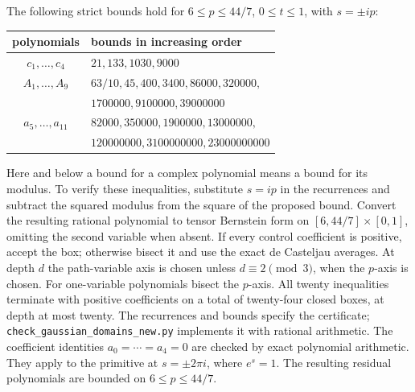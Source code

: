 \documentclass[11pt,reqno]{amsart}
\numberwithin{equation}{section}
\theoremstyle{definition}
\theoremstyle{remark}
\DeclareRobustCommand{\cert}[1]{\nolinkurl{#1}}
\begin{document}
The following strict bounds hold for
$6\le p\le44/7$, $0\le t\le1$, with $s=\pm ip$:
\begin{center}\small
\begin{tabular}{cl}
\toprule
polynomials & bounds in increasing order\\\midrule
$c_1,\ldots,c_4$ & $21,133,1030,9000$\\
$A_1,\ldots,A_9$ & $63/10,45,400,3400,86000,320000,$\\
 & $1700000,9100000,39000000$\\
$a_5,\ldots,a_{11}$ & $82000,350000,1900000,13000000,$\\
 & $120000000,3100000000,23000000000$\\\bottomrule
\end{tabular}
\end{center}
Here and below a bound for a complex polynomial means a bound for its
modulus. To verify these inequalities, substitute $s=ip$ in the
recurrences and subtract
the squared modulus from the square of the proposed bound. Convert
the resulting rational polynomial to tensor Bernstein form on
$[6,44/7]\times[0,1]$, omitting the second variable when absent.
If every control coefficient is positive, accept the box; otherwise
bisect it and use the exact de Casteljau averages. At depth $d$ the
path-variable axis is chosen unless $d\equiv2\pmod3$, when the
$p$-axis is chosen. For one-variable polynomials bisect the $p$-axis.
All twenty inequalities terminate with positive coefficients on a total
of twenty-four closed boxes, at depth at most twenty. The recurrences
and bounds specify the certificate;
\cert{check_gaussian_domains_new.py} implements it with rational arithmetic.
The coefficient identities $a_0=\cdots=a_4=0$ are checked by exact
polynomial arithmetic. They apply to the primitive at $s=\pm2\pi i$,
where $e^s=1$. The resulting residual polynomials are bounded on
$6\le p\le44/7$.
\end{document}
